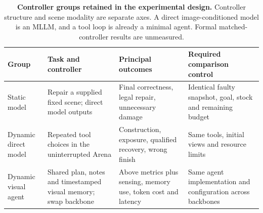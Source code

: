 \begin{table}[t]\centering\small
\caption{\textbf{Controller groups retained in the experimental design.} Controller structure and scene modality are separate axes. A direct image-conditioned model is an MLLM, and a tool loop is already a minimal agent. Formal matched-controller results are unmeasured.}
\label{tab:controller-arms}
\begin{tabularx}{\textwidth}{@{}lYYY@{}}\toprule
Group & Task and controller & Principal outcomes & Required comparison control\\\midrule
Static model & Repair a supplied fixed scene; direct model outputs & Final correctness, legal repair, unnecessary damage & Identical faulty snapshot, goal, stock and remaining budget\\
Dynamic direct model & Repeated tool choices in the uninterrupted Arena & Construction, exposure, qualified recovery, wrong finish & Same tools, initial views and resource limits\\
Dynamic visual agent & Shared plan, notes and timestamped visual memory; swap backbone & Above metrics plus sensing, memory use, token cost and latency & Same agent implementation and configuration across backbones\\\bottomrule
\end{tabularx}\end{table}
